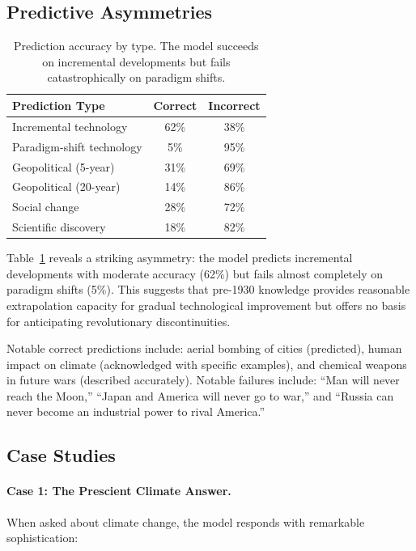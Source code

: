\documentclass[11pt]{article}
\begin{document}
\subsection{Predictive Asymmetries}

\begin{table}[t]
\centering
\small
\begin{tabular}{lcc}
\toprule
\textbf{Prediction Type} & \textbf{Correct} & \textbf{Incorrect} \\
\midrule
Incremental technology & 62\% & 38\% \\
Paradigm-shift technology & 5\% & 95\% \\
Geopolitical (5-year) & 31\% & 69\% \\
Geopolitical (20-year) & 14\% & 86\% \\
Social change & 28\% & 72\% \\
Scientific discovery & 18\% & 82\% \\
\bottomrule
\end{tabular}
\caption{Prediction accuracy by type. The model succeeds on incremental developments but fails catastrophically on paradigm shifts.}
\label{tab:predictions}
\end{table}

Table~\ref{tab:predictions} reveals a striking asymmetry: the model predicts incremental developments with moderate accuracy (62\%) but fails almost completely on paradigm shifts (5\%). This suggests that pre-1930 knowledge provides reasonable extrapolation capacity for gradual technological improvement but offers no basis for anticipating revolutionary discontinuities.

Notable correct predictions include: aerial bombing of cities (predicted), human impact on climate (acknowledged with specific examples), and chemical weapons in future wars (described accurately). Notable failures include: ``Man will never reach the Moon,'' ``Japan and America will never go to war,'' and ``Russia can never become an industrial power to rival America.''

\subsection{Case Studies}

\paragraph{Case 1: The Prescient Climate Answer.} When asked about climate change, the model responds with remarkable sophistication:
\end{document}
